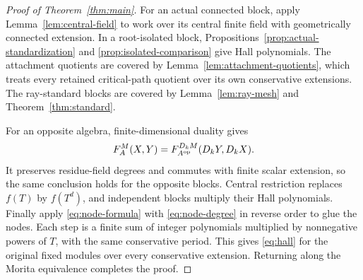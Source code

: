 \begin{proof}[Proof of Theorem~\ref{thm:main}]
For an actual connected block, apply Lemma~\ref{lem:central-field} to work over its central finite field with geometrically connected extension. In a root-isolated block, Propositions~\ref{prop:actual-standardization} and \ref{prop:isolated-comparison} give Hall polynomials. The attachment quotients are covered by Lemma~\ref{lem:attachment-quotients}, which treats every retained critical-path quotient over its own conservative extensions. The ray-standard blocks are covered by Lemma~\ref{lem:ray-mesh} and Theorem~\ref{thm:standard}.

For an opposite algebra, finite-dimensional duality gives
\[
 F_A^M(X,Y)=F_{A^{\rm op}}^{D_kM}(D_kY,D_kX).
\]
It preserves residue-field degrees and commutes with finite scalar extension, so the same conclusion holds for the opposite blocks. Central restriction replaces $f(T)$ by $f(T^d)$, and independent blocks multiply their Hall polynomials. Finally apply \eqref{eq:node-formula} with \eqref{eq:node-degree} in reverse order to glue the nodes. Each step is a finite sum of integer polynomials multiplied by nonnegative powers of $T$, with the same conservative period. This gives \eqref{eq:hall} for the original fixed modules over every conservative extension. Returning along the Morita equivalence completes the proof.
\end{proof}

